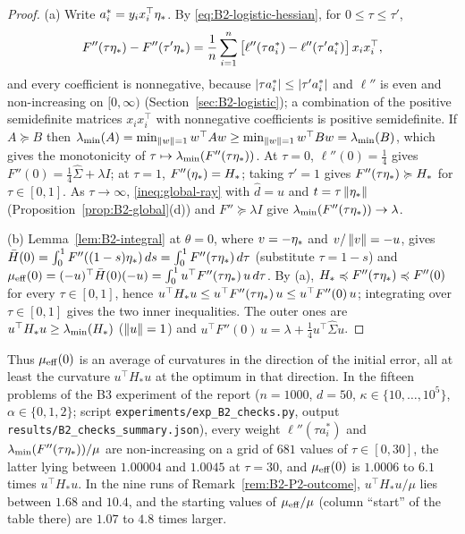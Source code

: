 \begin{proof}
(a) Write $a_i^\ast=y_ix_i^\top\eta_\ast$. By \eqref{eq:B2-logistic-hessian}, for $0\le\tau\le\tau'$,
\[
F''(\tau\eta_\ast)-F''(\tau'\eta_\ast)=\frac1n\sum_{i=1}^n\big[\ell''(\tau a_i^\ast)-\ell''(\tau'a_i^\ast)\big]\,x_ix_i^\top ,
\]
and every coefficient is nonnegative, because $\left|\tau a_i^\ast\right|\le\left|\tau'a_i^\ast\right|$ and $\ell''$ is even and
non-increasing on $[0,\infty)$ (Section~\ref{sec:B2-logistic}); a combination of the positive semidefinite matrices
$x_ix_i^\top$ with nonnegative coefficients is positive semidefinite. If $A\succcurlyeq B$ then
$\lambda_{\min}(A)=\min_{\left\|w\right\|=1}w^\top Aw\ge\min_{\left\|w\right\|=1}w^\top Bw=\lambda_{\min}(B)$, which gives the monotonicity of
$\tau\mapsto\lambda_{\min}(F''(\tau\eta_\ast))$. At $\tau=0$, $\ell''(0)=\frac14$ gives $F''(0)=\frac14\hat\Sigma+\lambda I$; at
$\tau=1$, $F''(\eta_\ast)=H_\ast$; taking $\tau'=1$ gives $F''(\tau\eta_\ast)\succcurlyeq H_\ast$ for $\tau\in[0,1]$. As
$\tau\to\infty$, \eqref{ineq:global-ray} with $\hat d=u$ and $t=\tau\left\|\eta_\ast\right\|$ (Proposition~\ref{prop:B2-global}(d))
and $F''\succcurlyeq\lambda I$ give $\lambda_{\min}(F''(\tau\eta_\ast))\to\lambda$.

(b) Lemma~\ref{lem:B2-integral} at $\theta=0$, where $v=-\eta_\ast$ and $v/\left\|v\right\|=-u$, gives
$\bar H(0)=\int_0^1F''((1-s)\eta_\ast)\,ds=\int_0^1F''(\tau\eta_\ast)\,d\tau$ (substitute $\tau=1-s$) and
$\mu_{\mathrm{eff}}(0)=(-u)^\top\bar H(0)(-u)=\int_0^1u^\top F''(\tau\eta_\ast)\,u\,d\tau$. By (a),
$H_\ast\preccurlyeq F''(\tau\eta_\ast)\preccurlyeq F''(0)$ for every $\tau\in[0,1]$, hence
$u^\top H_\ast u\le u^\top F''(\tau\eta_\ast)\,u\le u^\top F''(0)\,u$; integrating over $\tau\in[0,1]$ gives the two
inner inequalities. The outer ones are $u^\top H_\ast u\ge\lambda_{\min}(H_\ast)$ ($\left\|u\right\|=1$) and
$u^\top F''(0)\,u=\lambda+\frac14u^\top\hat\Sigma u$.
\end{proof}

Thus $\mu_{\mathrm{eff}}(0)$ is an average of curvatures in the direction of the initial error, all at least the curvature
$u^\top H_\ast u$ at the optimum in that direction. In the fifteen problems of the B3 experiment of the report
($n=1000$, $d=50$, $\kappa\in\{10,\dots,10^5\}$, $\alpha\in\{0,1,2\}$; script \texttt{experiments/exp\_B2\_checks.py},
output \texttt{results/B2\_checks\_summary.json}), every weight $\ell''(\tau a_i^\ast)$ and $\lambda_{\min}(F''(\tau\eta_\ast))/\mu$
are non-increasing on a grid of $681$ values of $\tau\in[0,30]$, the latter lying between $1.00004$ and $1.0045$ at
$\tau=30$, and $\mu_{\mathrm{eff}}(0)$ is $1.0006$ to $6.1$ times $u^\top H_\ast u$. In the nine runs of
Remark~\ref{rem:B2-P2-outcome}, $u^\top H_\ast u/\mu$ lies between $1.68$ and $10.4$, and the starting values of
$\mu_{\mathrm{eff}}/\mu$ (column ``start'' of the table there) are $1.07$ to $4.8$ times larger.


